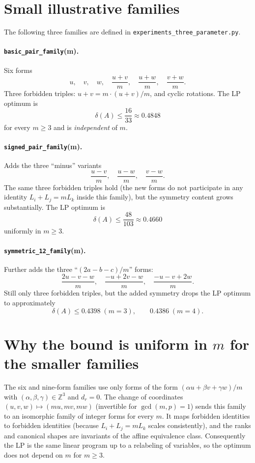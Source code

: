 \documentclass[11pt]{article}
\begin{document}
\section{Small illustrative families}

The following three families are defined in
\texttt{experiments\_three\_parameter.py}.

\paragraph{\texttt{basic\_pair\_family}(m).}
Six forms
\[
u,\quad v,\quad w,\quad \frac{u+v}{m},\quad \frac{u+w}{m},\quad \frac{v+w}{m}.
\]
Three forbidden triples: $u+v=m\cdot(u+v)/m$, and cyclic rotations. The LP
optimum is
\[
\boxed{\delta(A)\le \frac{16}{33}\approx 0.4848}
\]
for every $m\ge 3$ and is \emph{independent} of $m$.

\paragraph{\texttt{signed\_pair\_family}(m).}
Adds the three ``minus'' variants
\[
\frac{u-v}{m},\quad \frac{u-w}{m},\quad \frac{v-w}{m}.
\]
The same three forbidden triples hold (the new forms do not participate in any
identity $L_i+L_j=mL_k$ inside this family), but the symmetry content grows
substantially. The LP optimum is
\[
\boxed{\delta(A)\le \frac{48}{103}\approx 0.4660}
\]
uniformly in $m\ge 3$.

\paragraph{\texttt{symmetric\_12\_family}(m).}
Further adds the three ``$(2a-b-c)/m$'' forms:
\[
\frac{2u-v-w}{m},\quad \frac{-u+2v-w}{m},\quad \frac{-u-v+2w}{m}.
\]
Still only three forbidden triples, but the added symmetry drops the LP
optimum to approximately
\[
\delta(A)\le 0.4398 \;(m=3),\qquad 0.4386 \;(m=4).
\]

\section{Why the bound is uniform in $m$ for the smaller families}

The six and nine-form families use only forms of the form
$(\alpha u+\beta v+\gamma w)/m$ with $(\alpha,\beta,\gamma)\in\mathbb{Z}^3$ and
$d_r=0$. The change of coordinates $(u,v,w)\mapsto(mu,mv,mw)$ (invertible for
$\gcd(m,p)=1$) sends this family to an isomorphic family of integer forms for
every $m$. It maps forbidden identities to forbidden identities (because
$L_i+L_j=mL_k$ scales consistently), and the ranks and canonical shapes are
invariants of the affine equivalence class. Consequently the LP is the same
linear program up to a relabeling of variables, so the optimum does not depend
on $m$ for $m\ge 3$.
\end{document}
